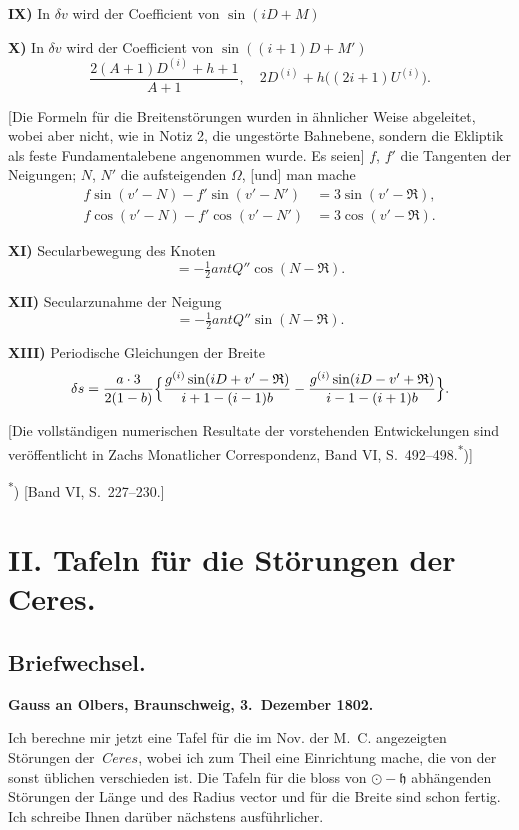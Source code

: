 \documentclass[12pt,a4paper]{article}
\newcommand{\Ceres}{\odot}
\newcommand{\Jupiter}{\mathfrak{h}}
\begin{document}
\medskip\noindent
\textbf{IX)} In $\delta v$ wird der Coefficient von $\sin(iD + M)$

\medskip\noindent
\textbf{X)} In $\delta v$ wird der Coefficient von $\sin((i+1)D + M')$
\[\frac{2(A+1)D^{(i)} + h+1}{A+1}, \quad 2D^{(i)} + h\bigl((2i+1)U^{(i)}\bigr).\]

[Die Formeln für die Breitenstörungen wurden in ähnlicher Weise abgeleitet, wobei aber nicht, wie in Notiz 2, die ungestörte Bahnebene, sondern die Ekliptik als feste Fundamentalebene angenommen wurde. Es seien] $f$, $f'$ die Tangenten der Neigungen; $N$, $N'$ die aufsteigenden $\Omega$, [und] man mache
\begin{align*}
f \sin(v' - N) - f' \sin(v' - N') &= 3 \sin(v' - \mathfrak{R}),\\
f \cos(v' - N) - f' \cos(v' - N') &= 3 \cos(v' - \mathfrak{R}).
\end{align*}

\newpage
\setcounter{page}{405}
%
\textbf{XI)} Secularbewegung des Knoten
\[= -\tfrac{1}{2} ant Q'' \cos(N - \mathfrak{R}).\]

\textbf{XII)} Secularzunahme der Neigung
\[= -\tfrac{1}{2} ant Q'' \sin(N - \mathfrak{R}).\]

\textbf{XIII)} Periodische Gleichungen der Breite
\[
\delta s = \frac{a \cdot 3}{2(1-b)} \Bigl\{\frac{g^{(i)} \sin(iD + v' - \mathfrak{R})}{i+1 - (i-1)b} - \frac{g^{(i)} \sin(iD - v' + \mathfrak{R})}{i-1 - (i+1)b}\Bigr\}.
\]

[Die vollständigen numerischen Resultate der vorstehenden Entwickelungen sind veröffentlicht in Zachs Monatlicher Correspondenz, Band VI, S.~492--498.\textsuperscript{*})]

\smallskip\noindent\textsuperscript{*}) [Band VI, S.~227--230.]

\newpage
\setcounter{page}{406}
%
\section*{II. Tafeln für die Störungen der Ceres.}

\subsection*{Briefwechsel.}

\noindent\textbf{Gauss an Olbers, Braunschweig, 3.~Dezember 1802.}

Ich berechne mir jetzt eine Tafel für die im Nov. der M.~C. angezeigten Störungen der $\ Ceres$, wobei ich zum Theil eine Einrichtung mache, die von der sonst üblichen verschieden ist. Die Tafeln für die bloss von $\Ceres - \Jupiter$ abhängenden Störungen der Länge und des Radius vector und für die Breite sind schon fertig. Ich schreibe Ihnen darüber nächstens ausführlicher.
\end{document}

